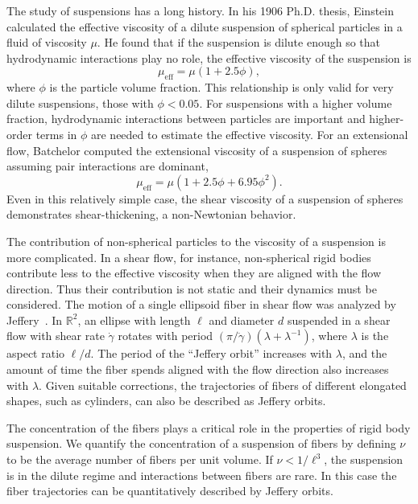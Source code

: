 The study of  suspensions has a long history. In his 1906 Ph.D. thesis, Einstein \cite{Einstein1906} calculated the effective viscosity of a dilute suspension of spherical particles in a fluid of viscosity $\mu$. He found that if the suspension is dilute enough so that hydrodynamic interactions play no role, the effective viscosity of the suspension is
\[ \mu_{\text{eff}} = \mu(1 + 2.5\phi),\]
where $\phi$ is the particle volume fraction. This relationship is only valid for very dilute suspensions, those with $\phi < 0.05$. For suspensions with a higher volume fraction, hydrodynamic interactions between particles are important and higher-order terms in $\phi$ are needed to estimate the effective viscosity. For an extensional flow, Batchelor \cite{Batchelor1971} computed the extensional viscosity of a suspension of spheres assuming pair interactions are dominant,
\[ \mu_{\text{eff}} = \mu(1 + 2.5\phi + 6.95\phi^2).\]
 Even in this relatively simple case, the shear viscosity of a suspension of spheres demonstrates shear-thickening, a non-Newtonian behavior.  
 
The contribution of non-spherical particles to the viscosity of a suspension is more complicated. 
 In a shear flow, for instance, non-spherical rigid bodies contribute less to the effective viscosity when they are aligned with the flow direction. Thus their contribution is not static and their dynamics must be considered. The motion of a single ellipsoid fiber in shear flow was analyzed by Jeffery~\cite{Jeffery1922}. In $\mathbb{R}^2$, an ellipse with length $\ell$ and diameter $d$ suspended in a shear flow with shear rate $\dot{\gamma}$ rotates with period $(\pi/\dot{\gamma})(\lambda + \lambda^{-1})$, where $\lambda$ is the aspect ratio $\ell/d$. The period of the ``Jeffery orbit'' increases with $\lambda$, and the amount of time the fiber spends  aligned with the flow direction also increases with $\lambda$.  Given suitable corrections, the trajectories of fibers of different elongated shapes, such as cylinders, can also be described as Jeffery orbits. 

The concentration of the fibers plays a critical role in the properties of rigid body suspension. We quantify the concentration of a suspension of fibers by defining $\nu$ to be the average number of fibers per unit volume. If $\nu < 1/\ell^3$, the suspension is in the dilute regime and interactions between fibers are rare. In this case the fiber trajectories can be quantitatively described  by Jeffery orbits. 

